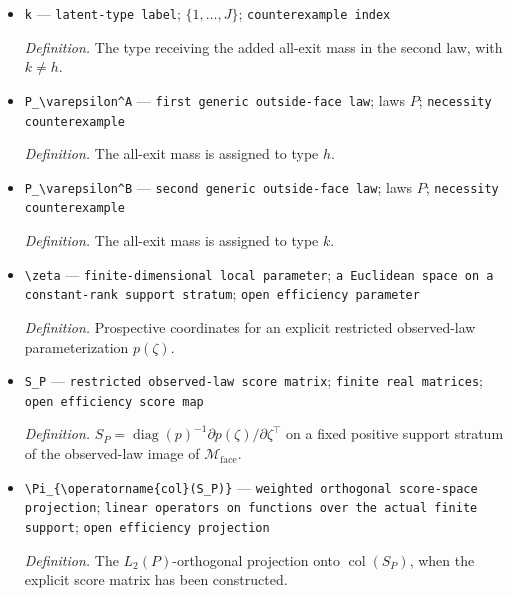 \documentclass{article}
\begin{document}
\begin{itemize}
  \par\smallskip\noindent\emph{Definition.} The type receiving the added all-exit mass in the first law, with \(h\neq k\).
  \item \texttt{k} --- \texttt{latent-\allowbreak{}type label}; \(\{1,\ldots,J\}\); \texttt{counterexample index}
  \par\smallskip\noindent\emph{Definition.} The type receiving the added all-exit mass in the second law, with \(k\neq h\).
  \item \texttt{P\_\allowbreak{}\textbackslash{}\allowbreak{}varepsilon\textasciicircum{}A} --- \texttt{first generic outside-\allowbreak{}face law}; laws \(P\); \texttt{necessity counterexample}
  \par\smallskip\noindent\emph{Definition.} The all-exit mass is assigned to type \(h\).
  \item \texttt{P\_\allowbreak{}\textbackslash{}\allowbreak{}varepsilon\textasciicircum{}B} --- \texttt{second generic outside-\allowbreak{}face law}; laws \(P\); \texttt{necessity counterexample}
  \par\smallskip\noindent\emph{Definition.} The all-exit mass is assigned to type \(k\).
  \item \texttt{\textbackslash{}\allowbreak{}zeta} --- \texttt{finite-\allowbreak{}dimensional local parameter}; \texttt{a Euclidean space on a constant-\allowbreak{}rank support stratum}; \texttt{open efficiency parameter}
  \par\smallskip\noindent\emph{Definition.} Prospective coordinates for an explicit restricted observed-law parameterization \(p(\zeta)\).
  \item \texttt{S\_\allowbreak{}P} --- \texttt{restricted observed-\allowbreak{}law score matrix}; \texttt{finite real matrices}; \texttt{open efficiency score map}
  \par\smallskip\noindent\emph{Definition.} \(S_P=\operatorname{diag}(p)^{-1}\partial p(\zeta)/\partial\zeta^\top\) on a fixed positive support stratum of the observed-law image of \(\mathcal M_{\mathrm{face}}\).
  \item \texttt{\textbackslash{}\allowbreak{}Pi\_\allowbreak{}\{\textbackslash{}\allowbreak{}operatorname\{col\}\allowbreak{}(S\_\allowbreak{}P)\}\allowbreak{}} --- \texttt{weighted orthogonal score-\allowbreak{}space projection}; \texttt{linear operators on functions over the actual finite support}; \texttt{open efficiency projection}
  \par\smallskip\noindent\emph{Definition.} The \(L_2(P)\)-orthogonal projection onto \(\operatorname{col}(S_P)\), when the explicit score matrix has been constructed.
\end{itemize}
\end{document}
